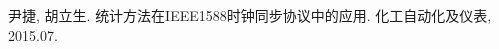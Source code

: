 
\begin{publications}{99}
    \item\textsc{尹捷, 胡立生}. {统计方法在IEEE1588时钟同步协议中的应用}. 化工自动化及仪表, 2015.07.
\end{publications}

